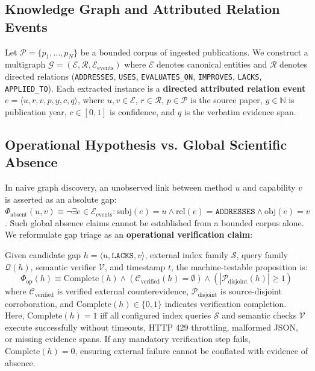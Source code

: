 \documentclass[runningheads]{llncs}
\begin{document}
\subsection{Knowledge Graph and Attributed Relation Events}
Let $\mathcal{P} = \{p_1, \dots, p_N\}$ be a bounded corpus of ingested publications. We construct a multigraph $\mathcal{G} = (\mathcal{E}, \mathcal{R}, \mathcal{E}_{\text{events}})$ where $\mathcal{E}$ denotes canonical entities and $\mathcal{R}$ denotes directed relations (\texttt{ADDRESSES}, \texttt{USES}, \texttt{EVALUATES\_ON}, \texttt{IMPROVES}, \texttt{LACKS}, \texttt{APPLIED\_\allowbreak TO}). Each extracted instance is a \textbf{directed attributed relation event} $e = \langle u, r, v, p, y, c, q \rangle$, where $u, v \in \mathcal{E}$, $r \in \mathcal{R}$, $p \in \mathcal{P}$ is the source paper, $y \in \mathbb{N}$ is publication year, $c \in [0, 1]$ is confidence, and $q$ is the verbatim evidence span.

\subsection{Operational Hypothesis vs. Global Scientific Absence}
In naive graph discovery, an unobserved link between method $u$ and capability $v$ is asserted as an absolute gap: $\Phi_{\text{absent}}(u, v) \equiv \neg \exists e \in \mathcal{E}_{\text{events}} : \text{subj}(e) = u \wedge \text{rel}(e) = \texttt{ADDRESSES} \wedge \text{obj}(e) = v$. Such global absence claims cannot be established from a bounded corpus alone. We reformulate gap triage as an \textbf{operational verification claim}:
\begin{definition}
Given candidate gap $h = \langle u, \texttt{LACKS}, v \rangle$, external index family $\mathcal{S}$, query family $\mathcal{Q}(h)$, semantic verifier $\mathcal{V}$, and timestamp $t$, the machine-testable proposition is:
\begin{equation}
\label{eq:operational_claim}
\Phi_{\text{op}}(h) \equiv \text{Complete}(h) \wedge \left( \mathcal{C}_{\text{verified}}(h) = \emptyset \right) \wedge \left( |\mathcal{P}_{\text{disjoint}}(h)| \ge 1 \right)
\end{equation}
where $\mathcal{C}_{\text{verified}}$ is verified external counterevidence, $\mathcal{P}_{\text{disjoint}}$ is source-disjoint corroboration, and $\text{Complete}(h) \in \{0, 1\}$ indicates verification completion. Here, $\text{Complete}(h) = 1$ iff all configured index queries $\mathcal{S}$ and semantic checks $\mathcal{V}$ execute successfully without timeouts, HTTP 429 throttling, malformed JSON, or missing evidence spans. If any mandatory verification step fails, $\text{Complete}(h) = 0$, ensuring external failure cannot be conflated with evidence of absence.
\end{definition}
\end{document}
